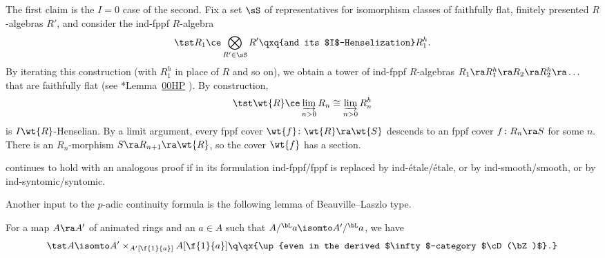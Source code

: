 \bpf
The first claim is the $I = 0$ case of the second. Fix a set $\sS$ of representatives for isomorphism classes of faithfully flat, finitely presented $R$-algebras $R'$, and consider the ind-fppf $R$-algebra
\[
\tst R_1 \ce \bigotimes_{R' \in \sS} R' \qxq{and its $I$-Henselization} R_1^h.
\]
By iterating this construction (with $R_1^h$ in place of $R$ and so on), we obtain a tower of ind-fppf $R$-algebras $R_1 \ra R_1^h \ra  R_2 \ra R_2^h \ra \dotsc$ that are faithfully flat (see \cite{SP}*{Lemma~\href{https://stacks.math.columbia.edu/tag/00HP}{00HP}}%
). By construction,
\[
\tst \wt{R} \ce \varinjlim_{n > 0} R_n \cong \varinjlim_{n > 0} R^h_n
\]
is $I\wt{R}$-Henselian. By a limit argument, every fppf cover $\wt{f} \colon \wt{R} \ra \wt{S}$ descends to an fppf cover $f\colon R_n \ra S$ for some $n$. There is an $R_n$-morphism $S\ra R_{n + 1} \ra \wt{R}$, so the cover $\wt{f}$ has a section.
\epf


\brem
{} continues to hold with an analogous proof if in its formulation ind-fppf/fppf is replaced by ind-\'{e}tale/\'{e}tale, or by ind-smooth/smooth, or by ind-syntomic/syntomic.
\erem



















Another input to the $p$-adic continuity formula is the following lemma of Beauville--Laszlo type.

\blem \label{lem:derived-BL-key}
For a map $A \ra A'$ of animated rings and an $a\in A$ such that $A/^\bL a \isomto A'/^\bL a$, we have
\[
\tst %
A \isomto A' \times_{A'[\f{1}{a}]} A[\f{1}{a}] \q\qx{\up{even in the derived $\infty$-category $\cD(\bZ)$}.}
\]
\elem

